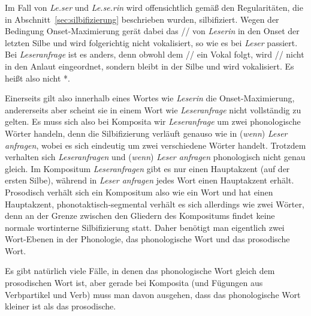 Im Fall von \textit{Le.ser} und \textit{Le.se.rin} wird offensichtlich gemäß den Regularitäten, die in Abschnitt~\ref{sec:silbifizierung} beschrieben wurden, silbifiziert.
Wegen der Bedingung Onset-Maximierung gerät dabei das // von \textit{Leserin} in den Onset der letzten Silbe und wird folgerichtig nicht vokalisiert, so wie es bei \textit{Leser} passiert.
Bei \textit{Leseranfrage} ist es anders, denn obwohl dem // ein Vokal folgt, wird // nicht in den Anlaut eingeordnet, sondern bleibt in der Silbe \textipa{[z5]} und wird vokalisiert.
Es heißt also nicht *.

Einerseits gilt also innerhalb eines Wortes wie \textit{Leserin} die Onset-Maximierung, andererseits aber scheint sie in einem Wort wie \textit{Leseranfrage} nicht vollständig zu gelten.
Es muss sich also bei Komposita wir \textit{Leseranfrage} um zwei phonologische Wörter handeln, denn die Silbifizierung verläuft genauso wie in (\textit{wenn}) \textit{Leser anfragen}, wobei es sich eindeutig um zwei verschiedene Wörter handelt.
Trotzdem verhalten sich \textit{Leseranfragen} und (\textit{wenn}) \textit{Leser anfragen} phonologisch nicht genau gleich.
Im Kompositum \textit{Leseranfragen} gibt es nur einen Hauptakzent (auf der ersten Silbe), während in \textit{Leser anfragen} jedes Wort einen Hauptakzent erhält.
Prosodisch verhält sich ein Kompositum also wie ein Wort und hat einen Hauptakzent, phonotaktisch-segmental verhält es sich allerdings wie zwei Wörter, denn an der Grenze zwischen den Gliedern des Kompositums findet keine normale wortinterne Silbifizierung statt.
Daher benötigt man eigentlich zwei Wort-Ebenen in der Phonologie, das phonologische Wort und das prosodische Wort.


Es gibt natürlich viele Fälle, in denen das phonologische Wort gleich dem prosodischen Wort ist, aber gerade bei Komposita (und \zB Fügungen aus Verbpartikel und Verb) muss man davon ausgehen, dass das phonologische Wort kleiner ist als das prosodische.

